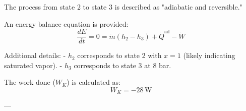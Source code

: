 The process from state 2 to state 3 is described as "adiabatic and reversible."  

An energy balance equation is provided:  
\[
\frac{dE}{dt} = 0 = \dot{m} (h_2 - h_3) + \dot{Q}^{\text{ad}} - \dot{W}
\]  

Additional details:  
- \( h_2 \) corresponds to state 2 with \( x = 1 \) (likely indicating saturated vapor).  
- \( h_3 \) corresponds to state 3 at 8 bar.  

The work done (\( W_K \)) is calculated as:  
\[
W_K = -28 \, \text{W}
\]  

---